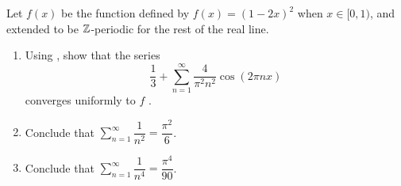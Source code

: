 \begin{ex}\label{ii:ex:5.5.2}
  Let \(f(x)\) be the function defined by \(f(x) = (1 - 2x)^2\) when \(x \in [0, 1)\), and extended to be \(\mathbb{Z}\)-periodic for the rest of the real line.
  \begin{enumerate}
    \item\label{ii:ex:5.5.2.a} Using , show that the series
    \[
      \dfrac{1}{3} + \sum_{n = 1}^\infty \dfrac{4}{\pi^2 n^2} \cos(2 \pi n x)
    \]
    converges uniformly to \(f\) .
    \item\label{ii:ex:5.5.2.b} Conclude that \(\sum_{n = 1}^\infty \dfrac{1}{n^2} = \dfrac{\pi^2}{6}\).
    \item\label{ii:ex:5.5.2.c} Conclude that \(\sum_{n = 1}^\infty \dfrac{1}{n^4} = \dfrac{\pi^4}{90}\).
  \end{enumerate}
\end{ex}

